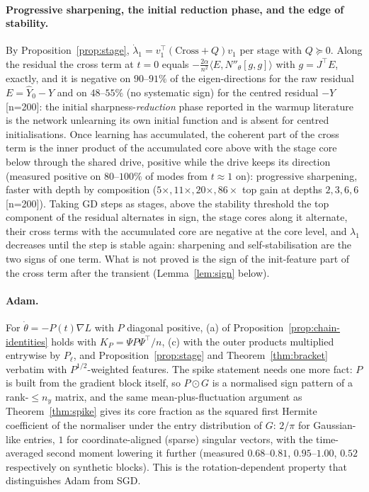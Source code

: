 \paragraph{Progressive sharpening, the initial reduction phase, and the edge of stability.}
By Proposition~\ref{prop:stage},
$\dot\lambda_1=v_1^{\!\top}(\mathrm{Cross}+Q)v_1$ per stage with $Q\succeq0$. Along
the residual the cross term at $t=0$ equals $-\frac{2\alpha}{n^2}\langle
E,N''_{\theta}[g,g]\rangle$ with $g=J^{\!\top}E$, exactly, and it is negative on
$90$--$91\%$ of the eigen-directions for the raw residual $E=\hat Y_0-Y$ and on
$48$--$55\%$ (no systematic sign) for the centred residual $-Y$ [n=200]: the
initial sharpness-\emph{reduction} phase reported in the warmup literature is
the network unlearning its own initial function and is absent for centred
initialisations. Once learning has accumulated, the coherent part of the cross
term is the inner product of the accumulated core above with the stage core
below through the shared drive, positive while the drive keeps its direction
(measured positive on $80$--$100\%$ of modes from $t\approx1$ on): progressive
sharpening, faster with depth by composition ($5\times,11\times,20\times,86\times$
top gain at depths $2,3,6,6$ [n=200]). Taking GD steps as stages, above the
stability threshold the top component of the residual alternates in sign, the
stage cores along it alternate, their cross terms with the accumulated core
are negative at the core level, and $\lambda_1$ decreases until the step is
stable again: sharpening and self-stabilisation are the two signs of one term.
What is not proved is the sign of the init-feature part of the cross term
after the transient (Lemma~\ref{lem:sign} below).

\paragraph{Adam.} For $\dot\theta=-P(t)\nabla L$ with $P$ diagonal positive, (a)
of Proposition~\ref{prop:chain-identities} holds with $K_P=\Psi P\Psi^{\!\top}/n$,
(c) with the outer products multiplied entrywise by $P_\ell$, and
Proposition~\ref{prop:stage} and Theorem~\ref{thm:bracket} verbatim with
$P^{1/2}$-weighted features. The spike statement needs one more fact: $P$ is
built from the gradient block itself, so $P\odot G$ is a normalised sign
pattern of a rank-$\le n_y$ matrix, and the same mean-plus-fluctuation
argument as Theorem~\ref{thm:spike} gives its core fraction as the squared first
Hermite coefficient of the normaliser under the entry distribution of $G$:
$2/\pi$ for Gaussian-like entries, $1$ for coordinate-aligned (sparse) singular
vectors, with the time-averaged second moment lowering it further (measured
$0.68$--$0.81$, $0.95$--$1.00$, $0.52$ respectively on synthetic blocks). This
is the rotation-dependent property that distinguishes Adam from SGD.

